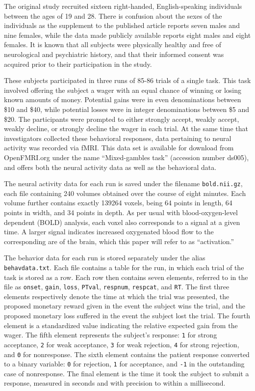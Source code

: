 \par The original study recruited sixteen right-handed, English-speaking
individuals between the ages of 19 and 28. There is confusion about the sexes of
the individuals as the supplement to the published article reports seven males
and nine females, while the data made publicly available reports eight males and
eight females. It is known that all subjects were physically healthy and free of
neurological and psychiatric history, and that their informed consent was
acquired prior to their participation in the study.
\par \indent These subjects participated in three runs of 85-86 trials of a
single task. This task involved offering the subject a wager with an equal
chance of winning or losing known amounts of money. Potential gains were in even
denominations between \$10 and \$40, while potential losses were in integer
denominations between \$5 and \$20. The participants were prompted to either
strongly accept, weakly accept, weakly decline, or strongly decline the wager in
each trial. At the same time that investigators collected these behavioral
responses, data pertaining to neural activity was recorded via fMRI. This data
set is available for download from OpenFMRI.org under the name ``Mixed-gambles
task'' (accession number ds005), and offers both the neural activity data as
well as the behavioral data.
\par \indent The neural activity data for each run is saved under the filename
\texttt{bold.nii.gz}, each file containing 240 volumes obtained over the course
of eight minutes. Each volume further contains exactly 139264 voxels, being 64
points in length, 64 points in width, and 34 points in depth. As per usual with
blood-oxygen-level dependent (BOLD) analysis, each voxel also corresponds to a
signal at a given time. A larger signal indicates increased oxygenated blood
flow to the corresponding are of the brain, which this paper will refer to as
``activation.''
\par \indent The behavior data for each run is stored separately under the alias
\texttt{behavdata.txt}. Each file contains a table for the run, in which each
trial of the task is stored as a row. Each row then contains seven elements,
referred to in the file as \texttt{onset}, \texttt{gain}, \texttt{loss},
\texttt{PTval}, \texttt{respnum}, \texttt{respcat}, and \texttt{RT}. The first
three elements respectively denote the time at which the trial was presented,
the proposed monetary reward given in the event the subject wins the trial, and
the proposed monetary loss suffered in the event the subject lost the trial. The
fourth element is a standardized value indicating the relative expected gain
from the wager. The fifth element represents the subject's response: \texttt{1}
for strong acceptance, \texttt{2} for weak acceptance, \texttt{3} for weak
rejection, \texttt{4} for strong rejection, and \texttt{0} for nonresponse. The
sixth element contains the patient response converted to a binary variable:
\texttt{0} for rejection, \texttt{1} for acceptance, and \texttt{-1} in the
outstanding case of nonresponse. The final element is the time it took the
subject to submit a response, measured in seconds and with precision to within a
millisecond.